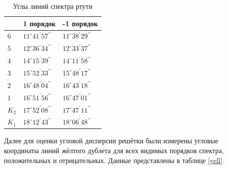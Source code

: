 \begin{table}[H]
    \centering
    \begin{tabular}{|p{2cm}|p{4cm}|p{4cm}|}
    \hline  \centering{№ линии} & 1 порядок & -1 порядок \\ \hline
$6$   & $11^{\circ} 41^{\prime} 57^{\prime \prime}$  & $11^{\circ} 38^{\prime} 29^{\prime \prime}$  \\ \hline
$5$   & $12^{\circ} 36^{\prime} 34^{\prime \prime}$  & $12^{\circ} 33^{\prime} 37^{\prime \prime}$  \\ \hline
$4$   & $14^{\circ} 15^{\prime} 39^{\prime \prime}$  & $14^{\circ} 11^{\prime} 58^{\prime \prime}$  \\ \hline
$3$   & $15^{\circ} 52^{\prime} 33^{\prime \prime}$  & $15^{\circ} 48^{\prime} 17^{\prime \prime}$  \\ \hline
$2$   & $16^{\circ} 48^{\prime} 04^{\prime \prime}$  & $16^{\circ} 43^{\prime} 18^{\prime \prime}$  \\ \hline
$1$   & $16^{\circ} 51^{\prime} 56^{\prime \prime}$  & $16^{\circ} 47^{\prime} 01^{\prime \prime}$  \\ \hline
$K_2$ & $17^{\circ} 52^{\prime} 08^{\prime \prime}$  & $17^{\circ} 47^{\prime} 11^{\prime \prime}$  \\ \hline
$K_1$ & $18^{\circ} 12^{\prime} 43^{\prime \prime}$  & $18^{\circ} 06^{\prime } 48^{\prime \prime}$  \\ \hline
    \end{tabular}
    \caption{Углы линий спектра ртути}
    \label{angles}
\end{table}
\n
Далее для оценки угловой дисперсии решётки были измерены угловые координаты линий жёлтого дублета для всех видимых порядков спектра, положительных и отрицательных. Данные представлены в таблице \ref{yell}.

